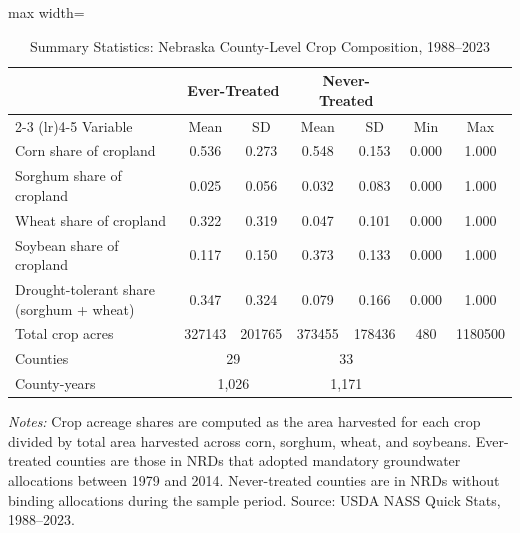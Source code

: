 \begin{table}[H]
\centering
\caption{Summary Statistics: Nebraska County-Level Crop Composition, 1988--2023}
\label{tab:summary}
\begin{threeparttable}
\begin{adjustbox}{max width=\textwidth}
\small
\begin{tabular}{lcccccc}
\toprule
 & \multicolumn{2}{c}{Ever-Treated} & \multicolumn{2}{c}{Never-Treated} & & \\
\cmidrule(lr){2-3} \cmidrule(lr){4-5}
Variable & Mean & SD & Mean & SD & Min & Max \\
\midrule
Corn share of cropland & 0.536 & 0.273 & 0.548 & 0.153 & 0.000 & 1.000 \\
Sorghum share of cropland & 0.025 & 0.056 & 0.032 & 0.083 & 0.000 & 1.000 \\
Wheat share of cropland & 0.322 & 0.319 & 0.047 & 0.101 & 0.000 & 1.000 \\
Soybean share of cropland & 0.117 & 0.150 & 0.373 & 0.133 & 0.000 & 1.000 \\
Drought-tolerant share (sorghum + wheat) & 0.347 & 0.324 & 0.079 & 0.166 & 0.000 & 1.000 \\
Total crop acres & 327143 & 201765 & 373455 & 178436 & 480 & 1180500 \\
\midrule
Counties & \multicolumn{2}{c}{29} & \multicolumn{2}{c}{33} & & \\
County-years & \multicolumn{2}{c}{1,026} & \multicolumn{2}{c}{1,171} & & \\
\bottomrule
\end{tabular}
\end{adjustbox}
\par\vspace{0.3em}
\noindent\begin{minipage}{\textwidth}
\footnotesize
\textit{Notes:} Crop acreage shares are computed as the area harvested for each crop divided by total area harvested across corn, sorghum, wheat, and soybeans. Ever-treated counties are those in NRDs that adopted mandatory groundwater allocations between 1979 and 2014. Never-treated counties are in NRDs without binding allocations during the sample period. Source: USDA NASS Quick Stats, 1988--2023.
\end{minipage}
\end{threeparttable}
\end{table}
